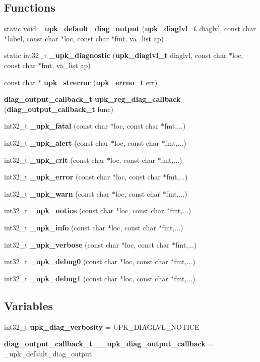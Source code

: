 \subsection*{Functions}
\begin{DoxyCompactItemize}
\item 
static void {\bf \_\-upk\_\-default\_\-diag\_\-output} ({\bf upk\_\-diaglvl\_\-t} diaglvl, const char $\ast$label, const char $\ast$loc, const char $\ast$fmt, va\_\-list ap)
\item 
static int32\_\-t {\bf \_\-upk\_\-diagnostic} ({\bf upk\_\-diaglvl\_\-t} diaglvl, const char $\ast$loc, const char $\ast$fmt, va\_\-list ap)
\item 
const char $\ast$ {\bf upk\_\-strerror} ({\bf upk\_\-errno\_\-t} err)
\item 
{\bf diag\_\-output\_\-callback\_\-t} {\bf upk\_\-reg\_\-diag\_\-callback} ({\bf diag\_\-output\_\-callback\_\-t} func)
\item 
int32\_\-t {\bf \_\-upk\_\-fatal} (const char $\ast$loc, const char $\ast$fmt,...)
\item 
int32\_\-t {\bf \_\-upk\_\-alert} (const char $\ast$loc, const char $\ast$fmt,...)
\item 
int32\_\-t {\bf \_\-upk\_\-crit} (const char $\ast$loc, const char $\ast$fmt,...)
\item 
int32\_\-t {\bf \_\-upk\_\-error} (const char $\ast$loc, const char $\ast$fmt,...)
\item 
int32\_\-t {\bf \_\-upk\_\-warn} (const char $\ast$loc, const char $\ast$fmt,...)
\item 
int32\_\-t {\bf \_\-upk\_\-notice} (const char $\ast$loc, const char $\ast$fmt,...)
\item 
int32\_\-t {\bf \_\-upk\_\-info} (const char $\ast$loc, const char $\ast$fmt,...)
\item 
int32\_\-t {\bf \_\-upk\_\-verbose} (const char $\ast$loc, const char $\ast$fmt,...)
\item 
int32\_\-t {\bf \_\-upk\_\-debug0} (const char $\ast$loc, const char $\ast$fmt,...)
\item 
int32\_\-t {\bf \_\-upk\_\-debug1} (const char $\ast$loc, const char $\ast$fmt,...)
\end{DoxyCompactItemize}
\subsection*{Variables}
\begin{DoxyCompactItemize}
\item 
int32\_\-t {\bf upk\_\-diag\_\-verbosity} = UPK\_\-DIAGLVL\_\-NOTICE
\item 
{\bf diag\_\-output\_\-callback\_\-t} {\bf \_\-\_\-upk\_\-diag\_\-output\_\-callback} = \_\-upk\_\-default\_\-diag\_\-output
\end{DoxyCompactItemize}


